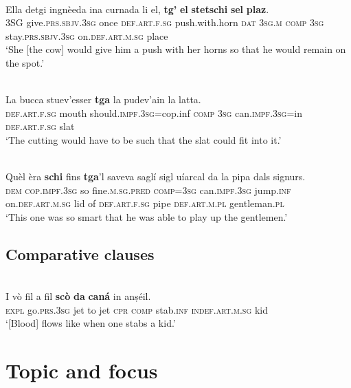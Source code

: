 \ea\label{ex:1:}
\\
\gll  Ella detgi ingnèeda ina curnada li el, \textbf{tg’} \textbf{el} \textbf{stetschi} \textbf{sel} \textbf{plaz}.\\
     3SG give.\textsc{prs.sbjv.3sg} once \textsc{def.art.f.sg} push.with.horn  \textsc{dat} \textsc{3sg.m} \textsc{comp} \textsc{3sg} stay.\textsc{prs.sbjv.3sg} on.\textsc{def.art.m.sg} place \\
\glt `She [the cow] would give him a push with her horns so that he would remain on the spot.'
\z

 \ea\label{}
\\
\gll   La bucca stuev'esser \textbf{tga} la pudev'ain la latta.\\
     \textsc{def.art.f.sg} mouth should.\textsc{impf.3sg}{=cop.inf} \textsc{comp} \textsc{3sg} can.\textsc{impf.3sg}=in \textsc{def.art.f.sg} slat\\
\glt `The cutting would have to be such that the slat could fit into it.'
\z


\ea\label{}
\\
\gll  Quèl èra \textbf{schi} fins \textbf{tga}’l saveva saglí sigl uíarcal da la pipa dals signurs.\\
    \textsc{dem} \textsc{cop.impf.3sg} so fine.\textsc{m.sg.pred} \textsc{comp}=\textsc{3sg} can.\textsc{impf.3sg} jump.\textsc{inf}  on.\textsc{def.art.m.sg} lid of \textsc{def.art.f.sg} pipe  \textsc{def.art.m.pl} gentleman.\textsc{pl}\\
\glt `This one was so smart that he was able to play up the gentlemen.'
\z


\subsection{Comparative clauses}

\ea\label{}
\\
\gll  I vò fil a fil \textbf{scò} \textbf{da} \textbf{caná} in anṣéil.\\
    \textsc{expl} go.\textsc{prs.3sg} jet to jet \textsc{cpr} \textsc{comp} stab.\textsc{inf} \textsc{indef.art.m.sg} kid \\
\glt `[Blood] flows like when one stabs a kid.'
\z



\section{Topic and focus}




